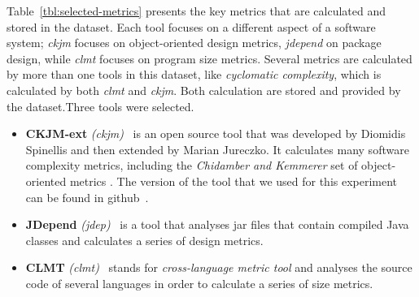 \documentclass{sig-alternate}
\begin{document}
Table~\ref{tbl:selected-metrics} presents the key metrics that are calculated and stored in the dataset. Each tool focuses on a different aspect of a software system; \textit{ckjm} focuses on object-oriented design metrics, \textit{jdepend} on package design, while \textit{clmt} focuses on program size metrics. Several metrics are calculated by more than one tools in this dataset, like \textit{cyclomatic complexity}, which is calculated by both \textit{clmt} and \textit{ckjm}. Both calculation are stored and provided by the dataset.Three tools were selected.

\begin{itemize}
  \item \textbf{CKJM-ext} \textit{(ckjm)}~\cite{Spi05g} is an open source tool that was developed by Diomidis Spinellis and then extended by Marian Jureczko. It calculates many software complexity metrics, including the \textit{Chidamber and Kemmerer} set of object-oriented metrics \cite{CHKE94}. The version of the tool that we used for this experiment can be found in github~\cite{CKJM}.

  \item \textbf{JDepend} \textit{(jdep)}~\cite{JDEPEND} is a tool that analyses {\sc jar} files that contain compiled Java classes and calculates a series of design metrics.

  \item \textbf{CLMT} \textit{(clmt)}~\cite{SGKL09} stands for \textit{cross-language metric tool} and analyses the source code of several languages in order to calculate a series of size metrics.
\end{itemize}
\end{document}
